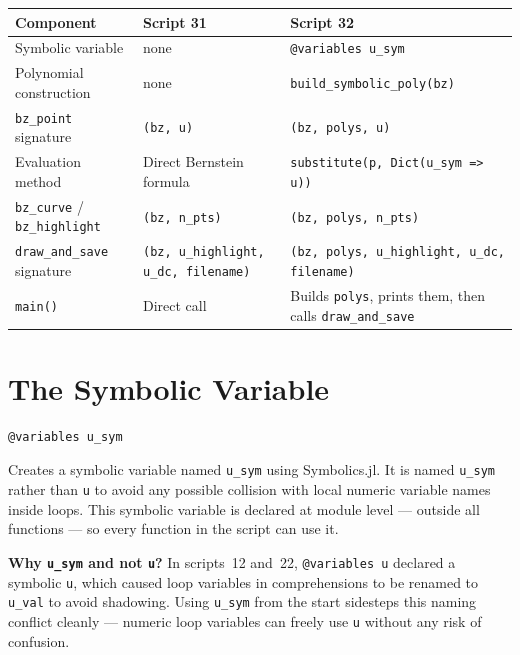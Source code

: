 \documentclass[12pt, a4paper]{article}
\newcommand{\cd}[1]{\texttt{#1}}
\begin{document}
\begin{center}
\begin{tabular}{lll}
\toprule
Component & Script 31 & Script 32 \\
\midrule
Symbolic variable & none & \cd{@variables u\_sym} \\
Polynomial construction & none & \cd{build\_symbolic\_poly(bz)} \\
\cd{bz\_point} signature &
  \cd{(bz, u)} &
  \cd{(bz, polys, u)} \\
Evaluation method &
  Direct Bernstein formula &
  \cd{substitute(p, Dict(u\_sym => u))} \\
\cd{bz\_curve} / \cd{bz\_highlight} &
  \cd{(bz, n\_pts)} &
  \cd{(bz, polys, n\_pts)} \\
\cd{draw\_and\_save} signature &
  \cd{(bz, u\_highlight, u\_dc, filename)} &
  \cd{(bz, polys, u\_highlight, u\_dc, filename)} \\
\cd{main()} &
  Direct call &
  Builds \cd{polys}, prints them, then calls \cd{draw\_and\_save} \\
\bottomrule
\end{tabular}
\end{center}


\section{The Symbolic Variable}

\begin{verbatim}
@variables u_sym
\end{verbatim}

Creates a symbolic variable named \cd{u\_sym} using
Symbolics.jl.
It is named \cd{u\_sym} rather than \cd{u} to avoid
any possible collision with local numeric variable names
inside loops.
This symbolic variable is declared at module level ---
outside all functions --- so every function in the
script can use it.

\begin{notebox}
\textbf{Why \cd{u\_sym} and not \cd{u}?}
In scripts~12 and~22, \cd{@variables u} declared a
symbolic \cd{u}, which caused loop variables in
comprehensions to be renamed to \cd{u\_val} to avoid
shadowing.
Using \cd{u\_sym} from the start sidesteps this naming
conflict cleanly --- numeric loop variables can freely
use \cd{u} without any risk of confusion.
\end{notebox}
\end{document}
